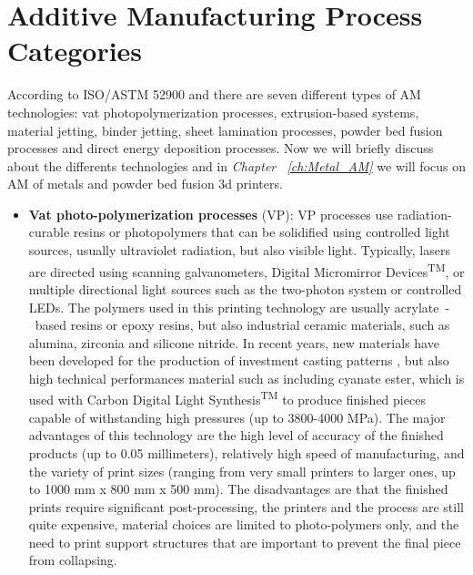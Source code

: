 \section{Additive Manufacturing Process Categories} \label{sec:AMproc}
According to ISO/ASTM 52900 \cite{international_standard_organization_isoastm_2015} and \citeauthor{gibson_additive_2015} there are seven different types of AM technologies: vat photopolymerization processes, extrusion-based systems, material jetting, binder jetting, sheet lamination processes, powder bed fusion processes and direct energy deposition processes. Now we will briefly discuss about the differents technologies and in \textit{Chapter~ \ref{ch:Metal_AM}} we will focus on AM of metals and powder bed fusion 3d printers.
\begin{itemize}
    \item \textbf{Vat photo-polymerization processes} (VP): VP processes use radiation-curable resins or photopolymers that can be solidified using controlled light sources, usually ultraviolet radiation, but also visible light. Typically, lasers are directed using scanning galvanometers, Digital Micromirror Devices\textsuperscript{TM}, or multiple directional light sources such as the two-photon system or controlled LEDs. The polymers used in this printing technology are usually acrylate~-~based resins or epoxy resins, but also industrial ceramic materials, such as alumina, zirconia and silicone nitride. In recent years, new materials have been developed for the production of investment casting patterns \cite{3d_systems_investment_nodate}, but also high technical performances material such as including cyanate ester, which is used with Carbon Digital Light Synthesis\textsuperscript{TM} to produce finished pieces capable of withstanding high pressures (up to 3800-4000 MPa)\cite{carbon_what_nodate}. The major advantages of this technology are the high level of accuracy of the finished products (up to 0.05 millimeters), relatively high speed of manufacturing, and the variety of print sizes (ranging from very small printers to larger ones, up to 1000 mm x 800 mm x 500 mm). The disadvantages are that the finished prints require significant post-processing, the printers and the process are still quite expensive, material choices are limited to photo-polymers only, and the need to print support structures that are important to prevent the final piece from collapsing.

\end{itemize}

